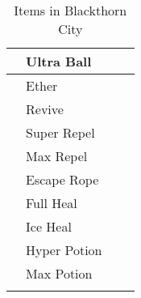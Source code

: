 \begin{longtable}{|| l l l l ||}%
\hline%
&Ultra Ball&&\\%
\hline%
&Ether&&\\%
\hline%
&Revive&&\\%
\hline%
&Super Repel&&\\%
\hline%
&Max Repel&&\\%
\hline%
&Escape Rope&&\\%
\hline%
&Full Heal&&\\%
\hline%
&Ice Heal&&\\%
\hline%
&Hyper Potion&&\\%
\hline%
&Max Potion&&\\%
\hline%
\endhead%
\hline%
\caption{Items in Blackthorn City}%
\label{tab:BlackthornCityItems}%
\end{longtable}